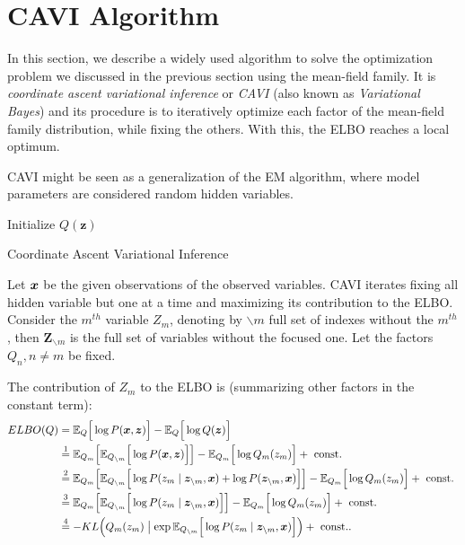 \section{CAVI Algorithm }

In this section, we describe a widely used algorithm to solve the optimization problem we discussed in the previous section using the mean-field family. It is \emph{coordinate ascent variational inference} or \emph{CAVI} (also known as \emph{Variational Bayes}) and its procedure is to iteratively optimize each factor of the mean-field family distribution, while fixing the others. With this, the ELBO reaches a local optimum.

CAVI might be seen as a generalization of the EM algorithm, where model parameters are considered random hidden variables.

 \begin{algorithm}[t]
  \SetAlgoLined{}
  Initialize \(Q(\bm{z})\)\;
  \;
  \caption{Coordinate Ascent Variational Inference}\label{alg:cavi}
\end{algorithm}


Let \(\bm{x}\) be the given observations of the observed variables. CAVI iterates fixing all hidden variable but one at a time and maximizing its contribution to the ELBO. Consider the \(m^{th}\) variable \(Z_{m}\), denoting by \(\backslash m\) full set of indexes without the \(m^{th}\), then \(\bm{Z}_{\backslash m}\) is the full set of variables without the focused one. Let the factors \(Q_{n}, n\neq m\) be fixed.

The contribution of \(Z_{m}\) to the ELBO is (summarizing other factors in the constant term):
\[
  \begin{aligned}
    ELBO(Q) &= \mathbb{E}_{Q}\Big[\log{P(\bm{x}, \bm{z})}\Big] - \mathbb{E}_{Q}\Big[\log{Q(\bm{z})}\Big]\\
    &\stackrel{1}{=} \mathbb{E}_{Q_{m}}\Big[\mathbb{E}_{Q_{\backslash m}}\Big[\log{P(\bm{x}, \bm{z})}\Big]\Big] - \mathbb{E}_{Q_{m}}\Big[\log{Q_{m}(z_{m})}\Big] + \text{ const. }\\
    &\stackrel{2}{=} \mathbb{E}_{Q_{m}}\Big[\mathbb{E}_{Q_{\backslash m}}\Big[\log{P(z_{m} \mid \bm{z}_{\backslash m}, \bm{x})} + \log{P(\bm{z}_{\backslash m}, \bm{x})}\Big]\Big] - \mathbb{E}_{Q_{m}}\Big[\log{Q_{m}(z_{m})}\Big] + \text{ const. }\\
    &\stackrel{3}{=}  \mathbb{E}_{Q_{m}}\Big[\mathbb{E}_{Q_{\backslash m}}\Big[\log{P(z_{m} \mid \bm{z}_{\backslash m}, \bm{x})}\Big]\Big] - \mathbb{E}_{Q_{m}}\Big[\log{Q_{m}(z_{m})}\Big] + \text{ const. }\\
    &\stackrel{4}{=} - KL\Big(Q_{m}(z_{m}) \bigm|   \exp{\mathbb{E}_{Q_{\backslash m}}\Big[\log{P(z_{m} \mid \bm{z}_{\backslash m}, \bm{x})}\Big]} \Big) + \text{ const.}.
  \end{aligned}
\]

